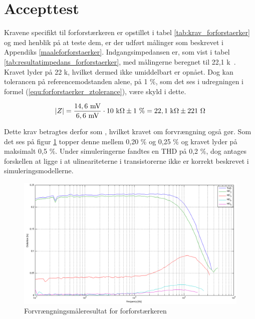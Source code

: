 \section{Accepttest}
\label{forforstaerker_accepttest}

Kravene specifikt til forforstærkeren er opstillet i tabel \ref{tab:krav_forforstaerker} og med henblik på at teste dem, er der udført målinger som beskrevet i Appendiks \ref{maaleforforstaerker}. Indgangsimpedansen er, som vist i tabel \ref{tab:resultatimpedans_forforstaerker}, med målingerne beregnet til 22,1 k\ohm~. Kravet lyder på 22 k\ohm, hvilket dermed ikke umiddelbart er opnået. Dog kan tolerancen på referencemodstanden alene, på 1 \%, som det ses i udregningen i formel (\ref{equ:forforstaerker_ztolerance}), være skyld i dette.

\begin{equation}
\label{equ:forforstaerker_ztolerance}
\vert Z \vert = \frac{\mathrm{14,6~mV}}{\mathrm{6,6~mV}} \cdot \mathrm{10~k\ohm} \pm 1~\% =  \mathrm{22,1~k\ohm} \pm 221~\ohm
\end{equation}

Dette krav betragtes derfor som \checkmark, hvilket kravet om forvrængning også gør. Som det ses på figur \ref{fig:accepttest-thdresultat-forforstaerker} topper denne mellem 0,20 \% og 0,25 \% og kravet lyder på maksimalt 0,5 \%. Under simuleringerne fandtes en THD på 0,2 \%, dog antages forskellen at ligge i at ulineariteterne i transistorerne ikke er korrekt beskrevet i simuleringsmodellerne. 

\begin{figure}[h]
\centering
\includegraphics[scale=0.3]{maalerapporter/forforstaerker/thd-forforstaerker.png}
\caption{Forvrængningsmåleresultat for forforstærkeren}
\label{fig:accepttest-thdresultat-forforstaerker}
\end{figure}

